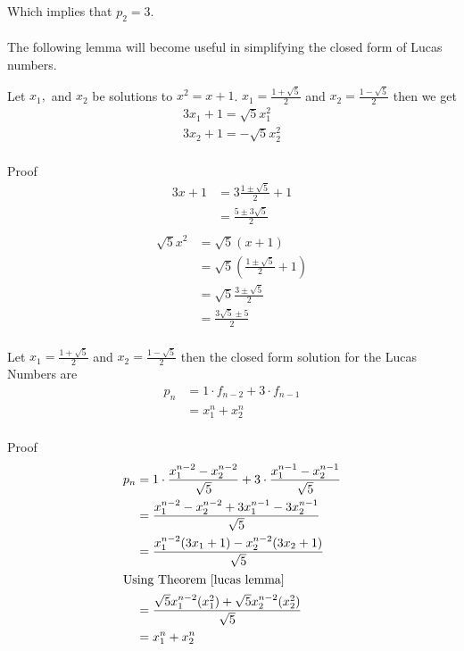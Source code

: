 \documentclass[a4paper]{article}
\begin{document}
Which implies that $p_2 = 3$.
\\
\\
The following lemma will become useful in simplifying the closed form of Lucas numbers.
\begin{theorem}\label{lucas lemma}
Let $x_1,$ and $x_2$ be solutions to $x^2 = x+1$. 
$x_1 = \frac{1 + \sqrt{5}}{2}$ and 
$x_2 = \frac{1 - \sqrt{5}}{2}$ then we get
\begin{equation*}
\begin{aligned}
3x_1 + 1 = \sqrt{5} x_1^2  \\
3x_2 + 1 = -\sqrt{5} x_2^2  \\
\end{aligned}
\end{equation*}

Proof 
\begin{equation*}
\begin{split}
3x + 1 &= 3 \frac{1 \pm \sqrt{5}}{2} + 1 \\
&= \frac{5 \pm 3\sqrt{5}}{2} \\
\end{split}
\end{equation*}
\begin{equation*}
\begin{split}
\sqrt{5} x^2 &= \sqrt{5} (x + 1) \\
&= \sqrt{5} (\frac{1 \pm \sqrt{5}}{2} + 1) \\
&= \sqrt{5} \frac{3 \pm \sqrt{5}}{2}  \\
&= \frac{3\sqrt{5} \pm 5}{2}  \\
\end{split}
\end{equation*}
\end{theorem}



\begin{theorem}\label{lucas closed}
Let 
$x_1 = \frac{1 + \sqrt{5}}{2}$ and 
$x_2 = \frac{1 - \sqrt{5}}{2}$ then 
the closed form solution for the Lucas Numbers are
\begin{equation}
\begin{split}
p_n &= 1 \cdot f_{n-2} + 3 \cdot f_{n-1} \\
&= x_1^n + x_2^n  \\
\end{split}
\end{equation}

Proof
\begin{equation*}
\begin{split}
p_n &= 1 \cdot \frac{x_1^{n-2} - x_2^{n-2}}{\sqrt{5}} + 3 \cdot \frac{x_1^{n-1} - x_2^{n-1}}{\sqrt{5}} \\
&= \frac{x_1^{n-2} - x_2^{n-2} + 3x_1^{n-1} - 3x_2^{n-1} }{\sqrt{5}} \\
&= \frac{x_1^{n-2}(3x_1 + 1) - x_2^{n-2}(3x_2 + 1) }{\sqrt{5}} \\
\shortintertext{Using Theorem \ref{lucas lemma}}
&= \frac{\sqrt{5} x_1^{n-2}(x_1^2) + \sqrt{5} x_2^{n-2}(x_2^2) }{\sqrt{5}} \\
&= x_1^{n} + x_2^{n}  \\
\end{split}
\end{equation*}
\end{theorem}
\end{document}
